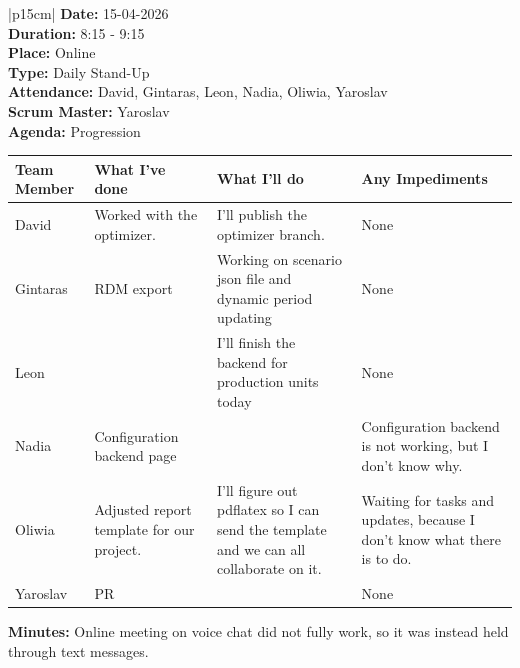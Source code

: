 \begin{table}[H]
    \centering
    \begin{tabular}{|p{15cm}|}   
        \hline
        \textbf{Date:}  15-04-2026 \\
        \textbf{Duration:} 8:15 - 9:15 \\
        \textbf{Place:}  Online \\
        \textbf{Type:} Daily Stand-Up \\
        \textbf{Attendance:}  David, Gintaras, Leon, Nadia, Oliwia, Yaroslav \\
        \textbf{Scrum Master:}  Yaroslav \\
        \textbf{Agenda:} Progression
        \begin{table}[H]
            \begin{tabular}{|p{1.75cm}|p{4cm}|p{4cm}|p{4cm}|}
                \hline
                \cellcolor[HTML]{BFBFBF}  \textbf{Team Member} & \cellcolor[HTML]{BFBFBF}  \textbf{What I've done} & \cellcolor[HTML]{BFBFBF}  \textbf{What I'll do} & \cellcolor[HTML]{BFBFBF}  \textbf{Any Impediments}\\
                \hline
                \cellcolor[HTML]{d4d4d4} David & Worked with the optimizer. & I’ll publish the optimizer branch. & None \\
                \hline
                \cellcolor[HTML]{d4d4d4} Gintaras & RDM export & Working on scenario json file and dynamic period updating & None \\
                \hline
                \cellcolor[HTML]{d4d4d4} Leon &  & I’ll finish the backend for production units today & None \\
                \hline
                \cellcolor[HTML]{d4d4d4} Nadia & Configuration backend page &  & Configuration backend is not working, but I don’t know why. \\
                \hline
                \cellcolor[HTML]{d4d4d4} Oliwia & Adjusted report template for our project. & I'll figure out pdflatex so I can send the template and we can all collaborate on it. & Waiting for tasks and updates, because I don’t know what there is to do. \\
                \hline
                \cellcolor[HTML]{d4d4d4} Yaroslav & PR &  & None \\
                \hline
            \end{tabular}
        \end{table}
        \textbf{Minutes:} Online meeting on voice chat did not fully work, so it was instead held through text messages. \\
        \hline
    \end{tabular}
\end{table}

